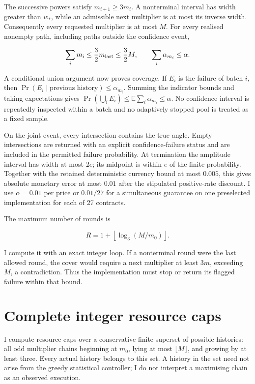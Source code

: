 The successive powers satisfy \(m_{i+1}\geq3m_i\). A nonterminal interval has width greater than \(w_*\), while an admissible next multiplier is at most its inverse width. Consequently every requested multiplier is at most \(M\). For every realised nonempty path, including paths outside the confidence event,

\[
 \sum_i m_i\leq\frac32m_{\rm last}\leq\frac32M,
 \qquad \sum_i\alpha_{m_i}\leq\alpha.
\]

A conditional union argument now proves coverage. If \(E_i\) is the failure of batch \(i\), then \(\Pr(E_i\mid\text{previous history})\leq\alpha_{m_i}\). Summing the indicator bounds and taking expectations gives \(\Pr(\bigcup_iE_i)\leq\mathbb E\sum_i\alpha_{m_i}\leq\alpha\). No confidence interval is repeatedly inspected within a batch and no adaptively stopped pool is treated as a fixed sample.

On the joint event, every intersection contains the true angle. Empty intersections are returned with an explicit confidence-failure status and are included in the permitted failure probability. At termination the amplitude interval has width at most \(2e\); its midpoint is within \(e\) of the finite probability. Together with the retained deterministic currency bound at most \(0.005\), this gives absolute monetary error at most \(0.01\) after the stipulated positive-rate discount. I use \(\alpha=0.01\) per price or \(0.01/27\) for a simultaneous guarantee on one preselected implementation for each of 27 contracts.

The maximum number of rounds is

\[
 R=1+\left\lfloor\log_3(M/m_0)\right\rfloor.
\]

I compute it with an exact integer loop. If a nonterminal round were the last allowed round, the cover would require a next multiplier at least \(3m\), exceeding \(M\), a contradiction. Thus the implementation must stop or return its flagged failure within that bound.

\section{Complete integer resource caps}
\label{sec:miqae-resources}

I compute resource caps over a conservative finite superset of possible histories: all odd multiplier chains beginning at \(m_0\), lying at most \(\lfloor M\rfloor\), and growing by at least three. Every actual history belongs to this set. A history in the set need not arise from the greedy statistical controller; I do not interpret a maximising chain as an observed execution.

